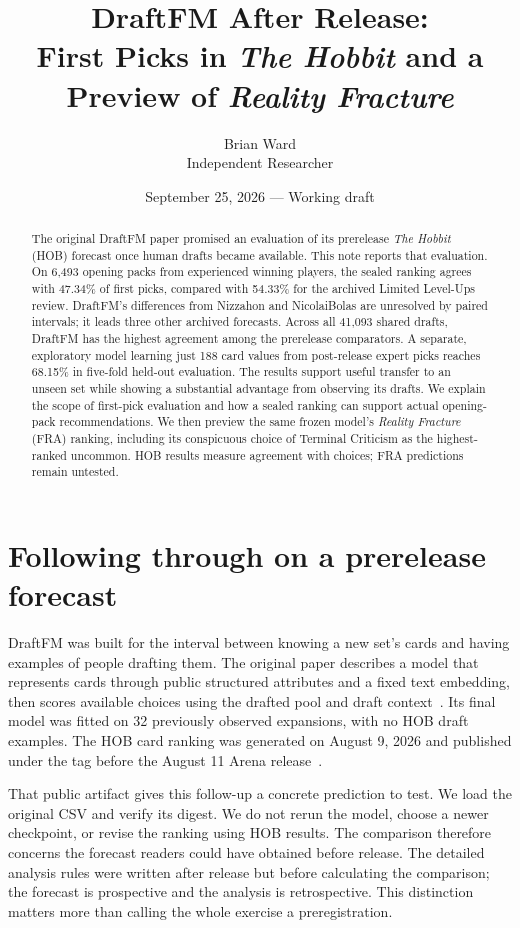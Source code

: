 \documentclass[11pt]{article}
\title{DraftFM After Release:\\First Picks in \emph{The Hobbit} and a Preview of \emph{Reality Fracture}}
\author{Brian Ward\\{\small Independent Researcher}}
\date{September 25, 2026 --- Working draft}
\newcommand{\code}[1]{\texttt{\detokenize{#1}}}
\begin{document}
\maketitle
\begin{abstract}
The original DraftFM paper promised an evaluation of its prerelease
\emph{The Hobbit} (HOB) forecast once human drafts became available. This note
reports that evaluation. On 6,493 opening packs from experienced winning
players, the sealed ranking agrees with 47.34\% of first picks, compared with
54.33\% for the archived Limited Level-Ups review. DraftFM's differences from
Nizzahon and NicolaiBolas are unresolved by paired intervals; it leads three
other archived forecasts. Across all 41,093 shared drafts, DraftFM has the
highest agreement among the prerelease comparators. A separate, exploratory
model learning just 188 card values from post-release expert picks reaches
68.15\% in five-fold held-out evaluation. The results support useful transfer
to an unseen set while showing a substantial advantage from observing its
drafts. We explain the scope of first-pick evaluation and how a sealed ranking
can support actual opening-pack recommendations. We then preview the same
frozen model's \emph{Reality Fracture} (FRA) ranking, including its conspicuous
choice of Terminal Criticism as the highest-ranked uncommon. HOB results
measure agreement with choices; FRA predictions remain untested.
\end{abstract}

\section{Following through on a prerelease forecast}

DraftFM was built for the interval between knowing a new set's cards and
having examples of people drafting them. The original paper describes a
model that represents cards through public structured attributes and a fixed
text embedding, then scores available choices using the drafted pool and
draft context~\cite{draftfm}. Its final model was fitted on 32 previously
observed expansions, with no HOB draft examples. The HOB card ranking was
generated on August 9, 2026 and published under the \code{draftfm-v1.0} tag
before the August 11 Arena release~\cite{seal}.

That public artifact gives this follow-up a concrete prediction to test.
We load the original CSV and verify its digest. We do not rerun the model,
choose a newer checkpoint, or revise the ranking using HOB results. The
comparison therefore concerns the forecast readers could have obtained
before release. The detailed analysis rules were written after release but
before calculating the comparison; the forecast is prospective and the
analysis is retrospective. This distinction matters more than calling the
whole exercise a preregistration.
\end{document}
